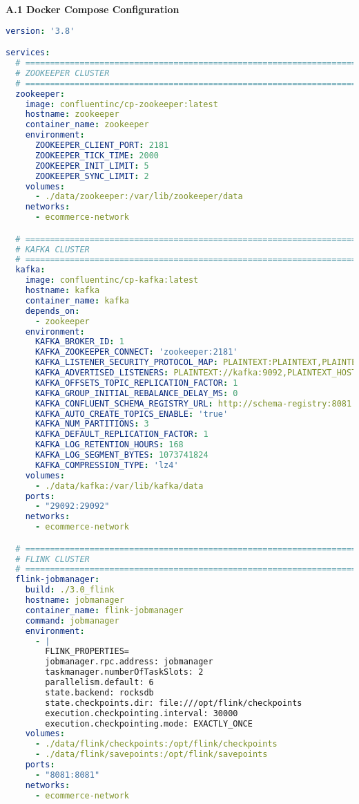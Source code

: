 \textbf{A.1 Docker Compose Configuration}
\begin{lstlisting}[language=yaml, caption=Configuración Docker Compose para Deployment, label=lst:docker_compose]
version: '3.8'

services:
  # ===================================================================
  # ZOOKEEPER CLUSTER
  # ===================================================================
  zookeeper:
    image: confluentinc/cp-zookeeper:latest
    hostname: zookeeper
    container_name: zookeeper
    environment:
      ZOOKEEPER_CLIENT_PORT: 2181
      ZOOKEEPER_TICK_TIME: 2000
      ZOOKEEPER_INIT_LIMIT: 5
      ZOOKEEPER_SYNC_LIMIT: 2
    volumes:
      - ./data/zookeeper:/var/lib/zookeeper/data
    networks:
      - ecommerce-network

  # ===================================================================
  # KAFKA CLUSTER
  # ===================================================================
  kafka:
    image: confluentinc/cp-kafka:latest
    hostname: kafka
    container_name: kafka
    depends_on:
      - zookeeper
    environment:
      KAFKA_BROKER_ID: 1
      KAFKA_ZOOKEEPER_CONNECT: 'zookeeper:2181'
      KAFKA_LISTENER_SECURITY_PROTOCOL_MAP: PLAINTEXT:PLAINTEXT,PLAINTEXT_HOST:PLAINTEXT
      KAFKA_ADVERTISED_LISTENERS: PLAINTEXT://kafka:9092,PLAINTEXT_HOST://localhost:29092
      KAFKA_OFFSETS_TOPIC_REPLICATION_FACTOR: 1
      KAFKA_GROUP_INITIAL_REBALANCE_DELAY_MS: 0
      KAFKA_CONFLUENT_SCHEMA_REGISTRY_URL: http://schema-registry:8081
      KAFKA_AUTO_CREATE_TOPICS_ENABLE: 'true'
      KAFKA_NUM_PARTITIONS: 3
      KAFKA_DEFAULT_REPLICATION_FACTOR: 1
      KAFKA_LOG_RETENTION_HOURS: 168
      KAFKA_LOG_SEGMENT_BYTES: 1073741824
      KAFKA_COMPRESSION_TYPE: 'lz4'
    volumes:
      - ./data/kafka:/var/lib/kafka/data
    ports:
      - "29092:29092"
    networks:
      - ecommerce-network

  # ===================================================================
  # FLINK CLUSTER
  # ===================================================================
  flink-jobmanager:
    build: ./3.0_flink
    hostname: jobmanager
    container_name: flink-jobmanager
    command: jobmanager
    environment:
      - |
        FLINK_PROPERTIES=
        jobmanager.rpc.address: jobmanager
        taskmanager.numberOfTaskSlots: 2
        parallelism.default: 6
        state.backend: rocksdb
        state.checkpoints.dir: file:///opt/flink/checkpoints
        execution.checkpointing.interval: 30000
        execution.checkpointing.mode: EXACTLY_ONCE
    volumes:
      - ./data/flink/checkpoints:/opt/flink/checkpoints
      - ./data/flink/savepoints:/opt/flink/savepoints
    ports:
      - "8081:8081"
    networks:
      - ecommerce-network


\end{lstlisting}
